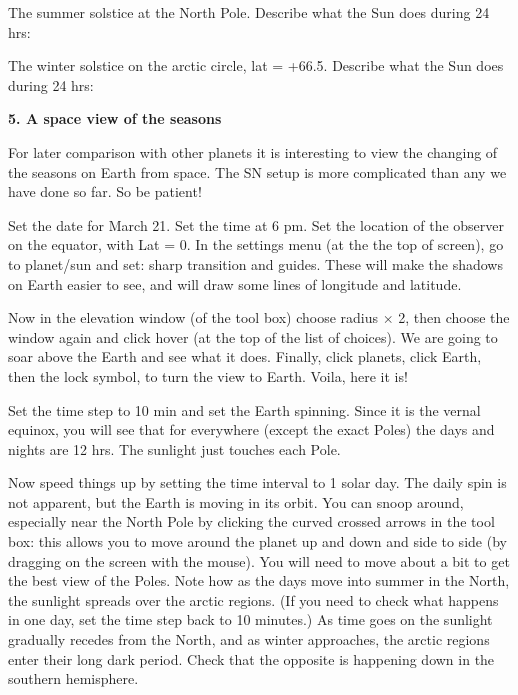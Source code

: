 \documentclass[12pt]{article}
\begin{document}
\medskip
 The summer solstice at the North Pole. Describe what the Sun
does during 24 hrs:

\medskip
 \hrulefill

\medskip
The winter solstice on the arctic circle, lat =
+66.5\deg.  Describe what the Sun does during 24 hrs:

\medskip
\hrulefill



\bigskip
\bigskip
\noindent
{\bf 5. A space view of the seasons}

\medskip
\noindent
For later comparison with other planets it is interesting to view the
changing of the seasons on Earth from space. The SN setup is more
complicated than any we have done so far. So be patient!

Set the date for March 21. Set the time at 6 pm.  Set the location of
the observer
on the equator, with Lat = 0\deg.  In the settings menu (at the the top
of screen), go to planet/sun and set: sharp transition and
guides. These will make the shadows on Earth easier to see, and will
draw some lines of longitude and latitude.

Now in the elevation window (of the tool box) choose radius $\times$
2, then choose the window again and click hover (at the top of the
list of choices). We are going to soar above the Earth and see what it
does. Finally, click planets, click Earth, then the lock symbol, to
turn the view to Earth. Voila, here it is!

Set the time step to 10 min and set the Earth spinning. Since it
is the vernal equinox, you will see that for everywhere (except the exact
Poles) the days and nights are 12 hrs. The sunlight just touches each
Pole.

Now speed things up by setting the time interval to 1 solar day. The
daily spin is not apparent, but the Earth is moving in its orbit. You
can snoop around, especially near the North Pole by clicking the
curved crossed arrows in the tool box: this allows you to move around
the planet up and down and side to side (by dragging on the screen
with the mouse). You will need to move about a bit to get the best
view of the Poles.  Note how as the days move into summer in the
North, the sunlight spreads over the arctic regions. (If you need to
check what happens in one day, set the time step back to 10 minutes.)
As time goes on the sunlight gradually recedes from the North, and as
winter approaches, the arctic regions enter their long dark
period. Check that the opposite is happening down in the southern
hemisphere.
\end{document}
